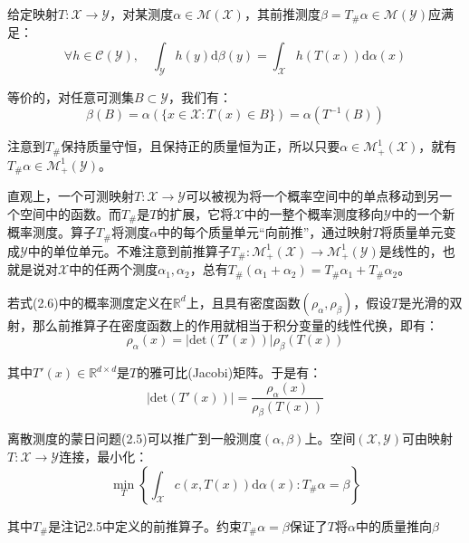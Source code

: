 \documentclass[cn,10pt,math=newtx,citestyle=gb7714-2015,bibstyle=gb7714-2015]{elegantbook}
\begin{document}
\begin{definition}[前推]
给定映射$T:\mathcal{X}\to\mathcal{Y}$，对某测度$\alpha\in\mathcal{M(X)}$，其前推测度$\beta=T_\#\alpha\in\mathcal{M(Y)}$应满足：
\begin{equation}
    \label{2.6}
    \forall h\in\mathcal{C(Y)},\quad \int_\mathcal{Y}h(y)\text{d}\beta(y)=\int_\mathcal{X}h(T(x))\text{d}\alpha(x)
\end{equation}

等价的，对任意可测集$B\subset\mathcal{Y}$，我们有：
\begin{equation}
    \label{2.7}
    \beta(B)=\alpha(\{x\in\mathcal{X}:T(x)\in B\})=\alpha(T^{-1}(B))
\end{equation}

注意到$T_\#$保持质量守恒，且保持正的质量恒为正，所以只要$\alpha\in\mathcal{M}_+^1(\mathcal{X})$，就有$T_\#\alpha\in\mathcal{M}_+^1(\mathcal{Y})$。

\end{definition}

直观上，一个可测映射$T:\mathcal{X}\to\mathcal{Y}$可以被视为将一个概率空间中的单点移动到另一个空间中的函数。而$T_\#$是$T$的扩展，它将$\mathcal{X}$中的一整个概率测度移向$\mathcal{Y}$中的一个新概率测度。算子$T_\#$将测度$\alpha$中的每个质量单元“向前推”，通过映射$T$将质量单元变成$\mathcal{Y}$中的单位单元。不难注意到前推算子$T_\#:\mathcal{M}_+^1(\mathcal{X})\to \mathcal{M}_+^1(\mathcal{Y})$是线性的，也就是说对$\mathcal{X}$中的任两个测度$\alpha_1,\alpha_2$，总有$T_\#(\alpha_1+\alpha_2)=T_\#\alpha_1+T_\#\alpha_2$。

\begin{postulate}[多元密度的前推]
若式(2.6)中的概率测度定义在$\mathbb{R}^d$上，且具有密度函数$(\rho_\alpha,\rho_\beta)$，假设$T$是光滑的双射，那么前推算子在密度函数上的作用就相当于积分变量的线性代换，即有：
\begin{equation}
	\label{2.8}
	\rho_\alpha(x)=|\text{det}(T'(x))|\rho_\beta(T(x))
\end{equation}

其中$T'(x)\in \mathbb{R}^{d\times d}$是$T$的雅可比(Jacobi)矩阵。于是有：
\begin{equation*}
	|\text{det}(T'(x))|=\frac{\rho_\alpha(x)}{\rho_\beta(T(x))}
\end{equation*}

\end{postulate}

\begin{postulate}[一般测度的蒙日问题]
离散测度的蒙日问题(2.5)可以推广到一般测度$(\alpha,\beta)$上。空间$(\mathcal{X,Y})$可由映射$T:\mathcal{X}\to\mathcal{Y}$连接，最小化：
\begin{equation}
	\label{2.9}
	\min\limits_T \left\{\int_\mathcal{X}c(x,T(x))\text{d}\alpha(x):T_\#\alpha=\beta\right\}
\end{equation}

其中$T_\#$是注记2.5中定义的前推算子。约束$T_\#\alpha=\beta$保证了$T$将$\alpha$中的质量推向$\beta$
\end{postulate}
\end{document}
